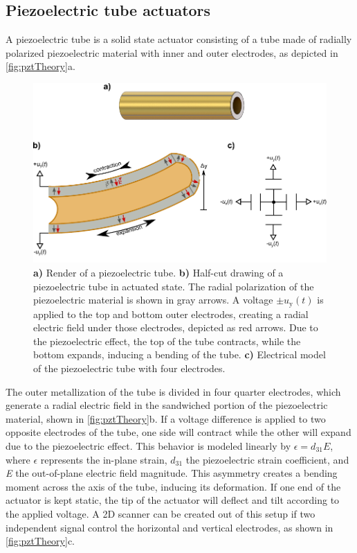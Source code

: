 {\subsection{Piezoelectric tube actuators}
A piezoelectric tube is a solid state actuator consisting of a tube made of radially polarized piezoelectric material with inner and outer electrodes, as depicted in \autoref{fig:pztTheory}a. 
\begin{figure}[h!]
      \centering
      \includegraphics{figures/20_Theory/Mechanical/pztTheory.pdf}
      \caption{	\textbf{a)} Render of a piezoelectric tube.
      			\textbf{b)} Half-cut drawing of a piezoelectric tube in actuated state. The radial polarization of the piezoelectric material is shown in gray arrows. A voltage $\pm u_\mathrm{y}(t)$ is applied to the top and bottom outer electrodes, creating a radial electric field under those electrodes, depicted as red arrows. Due to the piezoelectric effect, the top of the tube contracts, while the bottom expands, inducing a bending of the tube.
      			\textbf{c)} Electrical model of the piezoelectric tube with four electrodes.}
      \label{fig:pztTheory}
\end{figure}
The outer metallization of the tube is divided in four quarter electrodes, which generate a radial electric field in the sandwiched portion of the piezoelectric material, shown in \autoref{fig:pztTheory}b. If a voltage difference is applied to two opposite electrodes of the tube, one side will contract while the other will expand due to the piezoelectric effect. This behavior is modeled \cite{Arnau2008} linearly by $\epsilon = d_{31} E$, where $\epsilon$ represents the in-plane strain, $d_{31}$ the piezoelectric strain coefficient, and \textit{E} the out-of-plane electric field magnitude. This asymmetry creates a bending moment across the axis of the tube, inducing its deformation. If one end of the actuator is kept static, the tip of the actuator will deflect and tilt according to the applied voltage. A 2D scanner can be created out of this setup if two independent signal control the horizontal and vertical electrodes, as shown in \autoref{fig:pztTheory}c.

}
